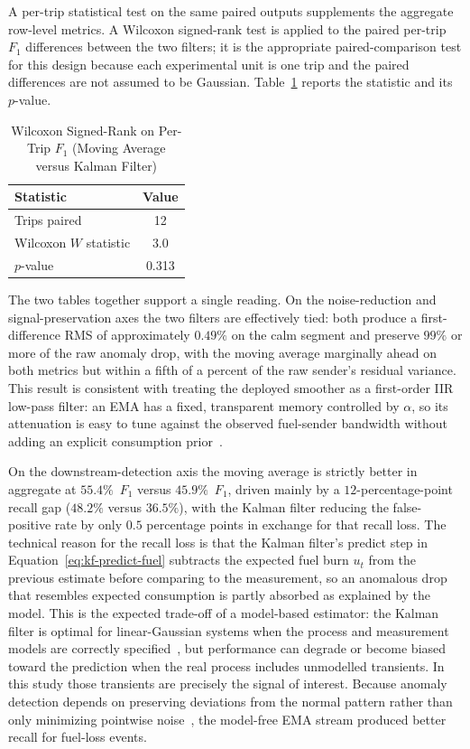 A per-trip statistical test on the same paired outputs supplements the aggregate row-level metrics. A Wilcoxon signed-rank test is applied to the paired per-trip $F_1$ differences between the two filters; it is the appropriate paired-comparison test for this design because each experimental unit is one trip and the paired differences are not assumed to be Gaussian. Table~\ref{tab:so1_filter_stats} reports the statistic and its $p$-value.

\begin{table}[!htbp]
\centering
\caption{Wilcoxon Signed-Rank on Per-Trip $F_1$ (Moving Average versus Kalman Filter)}
\label{tab:so1_filter_stats}
\small
\begin{tabular}{|p{}|c|}
\hline
\textbf{Statistic} & \textbf{Value} \\
\hline
Trips paired & 12 \\
\hline
Wilcoxon $W$ statistic & 3.0 \\
\hline
$p$-value & 0.313 \\
\hline
\end{tabular}
\end{table}

The two tables together support a single reading. On the noise-reduction and signal-preservation axes the two filters are effectively tied: both produce a first-difference RMS of approximately $0.49\%$ on the calm segment and preserve $99\%$ or more of the raw anomaly drop, with the moving average marginally ahead on both metrics but within a fifth of a percent of the raw sender's residual variance. This result is consistent with treating the deployed smoother as a first-order IIR low-pass filter: an EMA has a fixed, transparent memory controlled by $\alpha$, so its attenuation is easy to tune against the observed fuel-sender bandwidth without adding an explicit consumption prior~\cite{oppenheim2010dsp}.

On the downstream-detection axis the moving average is strictly better in aggregate at $55.4\%$~$F_1$ versus $45.9\%$~$F_1$, driven mainly by a $12$-percentage-point recall gap ($48.2\%$ versus $36.5\%$), with the Kalman filter reducing the false-positive rate by only $0.5$ percentage points in exchange for that recall loss. The technical reason for the recall loss is that the Kalman filter's predict step in Equation~\ref{eq:kf-predict-fuel} subtracts the expected fuel burn $u_t$ from the previous estimate before comparing to the measurement, so an anomalous drop that resembles expected consumption is partly absorbed as explained by the model. This is the expected trade-off of a model-based estimator: the Kalman filter is optimal for linear-Gaussian systems when the process and measurement models are correctly specified~\cite{kalman1960new,simon2006optimal}, but performance can degrade or become biased toward the prediction when the real process includes unmodelled transients. In this study those transients are precisely the signal of interest. Because anomaly detection depends on preserving deviations from the normal pattern rather than only minimizing pointwise noise~\cite{chandola2009anomaly,campos2016unsupervised}, the model-free EMA stream produced better recall for fuel-loss events.

